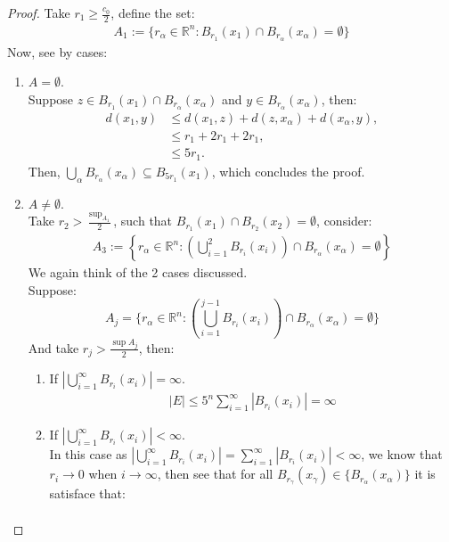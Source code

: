 \begin{proof} 
  Take $r_1\geq \frac{c_0}{2}$, define the set:
  \begin{align*}
    A_1:=\{r_{\alpha}\in\mathbb{R}^{n}:B_{r_1}(x_1)\cap B_{r_{\alpha}}(x_{\alpha})=\emptyset\}
  \end{align*}
  Now, see by cases:
  \begin{enumerate}
    \item $A=\emptyset$.\\
      Suppose $z\in B_{r_1}(x_1)\cap B_{r_{\alpha}}(x_{\alpha})$ and $y\in B_{r_{\alpha}}(x_{\alpha})$, then: 
      \begin{align*}
        d(x_1,y)&\leq d(x_1,z) + d(z,x_{\alpha}) + d(x_{\alpha},y),\\
        &\leq r_1+2r_1+2r_1,\\
        &\leq 5r_1.
      \end{align*}
      Then, $\bigcup_{\alpha}B_{r_{\alpha}}(x_{\alpha})\subseteq B_{5r_1}(x_1)$, which concludes the proof.
    \item $A\neq \emptyset$.\\
      Take $r_2> \frac{\sup_{A_1}}{2}$, such that $B_{r_1}(x_1)\cap B_{r_2}(x_2)=\emptyset$, consider:
      \begin{align*}
        A_3:=\left\{r_\alpha\in\mathbb{R}^{n}:\left(\bigcup_{i=1}^{2}B_{r_i}(x_i)\right)\cap B_{r_{\alpha}}(x_{\alpha})=\emptyset\right\}
      \end{align*}
      We again think of the 2 cases discussed.\\
      Suppose:
      $$A_j=\{r_{\alpha}\in\mathbb{R}^{n}:\left( \bigcup_{i=1}^{j-1}B_{r_{i}}(x_i) \right)\cap B_{r_{\alpha}}(x_{\alpha})=\emptyset\}$$
      And take $r_{j}>\frac{\sup A_j}{2}$, then:
      \begin{enumerate}
        \item If $|\bigcup_{i=1}^{\infty}B_{r_i}(x_i)|=\infty$.
          \begin{align*}
            |E|\leq 5^n\sum_{i=1}^{\infty}|B_{r_i}(x_i)|=\infty
          \end{align*}
        \item If $|\bigcup_{i=1}^{\infty}B_{r_i}(x_i)|<\infty$.\\
          In this case as $\left| \bigcup_{i=1}^{\infty}B_{r_i}(x_i) \right|=\sum_{i=1}^{\infty}|B_{r_{i}}(x_i)|<\infty$, we know that $r_i\rightarrow 0$ when $i\rightarrow\infty$, then see that for all $B_{r_{\gamma}}(x_{\gamma})\in\{B_{r_{\alpha}}(x_{\alpha})\}$ it is satisface that:
          \begin{align*}

\end{align*}
\end{enumerate}
\end{enumerate}
\end{proof}

